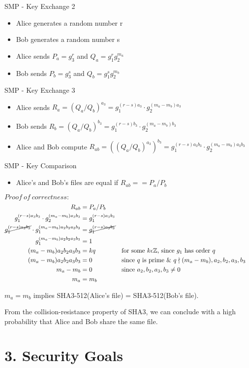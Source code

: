 \documentclass{article}
\begin{document}
SMP - Key Exchange 2
\begin{itemize}
  \item Alice generates a random number r
  \item Bob generates a random number s
  \item Alice sends $P_a = g_3^r$ and $Q_a = g_1^rg_2^{m_a}$
  \item Bob sends $P_b = g_3^s$ and $Q_b = g_1^sg_2^{m_b}$
\end{itemize}

SMP - Key Exchange 3
\begin{itemize}
  \item Alice sends $R_a = (Q_a/Q_b)^{a_3} = g_1^{(r-s)a_3}\cdot g_2^{(m_a-m_b)a_3}$
  \item Bob sends $R_b = (Q_a/Q_b)^{b_3} = g_1^{(r-s)b_3}\cdot g_2^{(m_a-m_b)b_3}$
  \item Alice and Bob compute $R_{ab} = ((Q_a/Q_b)^{a_3})^{b_3} = 
  g_1^{(r-s)a_3b_3} \cdot g_2^{(m_a-m_b)a_3b_3}$
\end{itemize}
SMP - Key Comparison
\begin{itemize}
  \item Alice's and Bob's files are equal if $R_{ab} == P_a / P_b$
\end{itemize}

$Proof\ of\ correctness:$
\begin{align*}
  R_{ab} &= P_a / P_b\\
  g_1^{(r-s)a_3b_3} \cdot g_2^{(m_a-m_b)a_3b_3} &= g_1^{(r-s)a_3b_3}\\
  \cancel{g_1^{(r-s)a_3b_3}} \cdot g_1^{(m_a-m_b)a_2b_2a_3b_3} &= \cancel{g_1^{(r-s)a_3b_3}}\\
  g_1^{(m_a-m_b)a_2b_2a_3b_3} &= 1\\
  (m_a-m_b)a_2b_2a_3b_3 &= kq && \text{for some $k \epsilon \mathbb{Z}$, since $g_1$ has order $q$}\\
  (m_a-m_b)a_2b_2a_3b_3 &= 0 && \text{since $q$ is prime \&\ } q \nmid (m_a-m_b), a_2, b_2,a_3, b_3\\
  m_a - m_b &= 0 &&\text{since $a_2, b_2, a_3, b_3 \neq 0$}\\
  m_a &= m_b
\end{align*}

$m_a = m_b$ implies SHA3-512(Alice's file) = SHA3-512(Bob's file).

From the collision-resistance property of SHA3, we can conclude with a high probability 
that Alice and Bob share the same file.

\section*{3. Security Goals}
\end{document}
